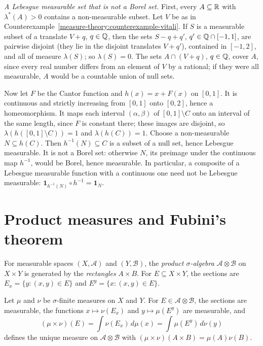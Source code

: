 \begin{counterexample}\label{measure-theory:counterexample-non-borel}
\emph{A Lebesgue measurable set that is not a Borel set.} First, every $A \subseteq \mathbb{R}$ with $\lambda^*(A) > 0$ contains a non-measurable subset. Let $V$ be as in
Counterexample~\ref{measure-theory:counterexample-vitali}. If $S$ is a measurable subset of a translate $V + q$, $q \in \mathbb{Q}$, then the sets $S - q + q'$,
$q' \in \mathbb{Q} \cap [-1, 1]$, are pairwise disjoint (they lie in the disjoint translates $V + q'$), contained in $[-1, 2]$, and all of measure $\lambda(S)$; so
$\lambda(S) = 0$. The sets $A \cap (V + q)$, $q \in \mathbb{Q}$, cover $A$, since every real number differs from an element of $V$ by a rational; if they were all
measurable, $A$ would be a countable union of null sets.

Now let $F$ be the Cantor function and $h(x) = x + F(x)$ on $[0, 1]$. It is continuous and strictly increasing from $[0, 1]$ onto $[0, 2]$, hence a
homeomorphism. It maps each interval $(\alpha, \beta)$ of $[0, 1] \setminus C$ onto an interval of the same length, since $F$ is constant there; these images are
disjoint, so $\lambda(h([0, 1] \setminus C)) = 1$ and $\lambda(h(C)) = 1$. Choose a non-measurable $N \subseteq h(C)$. Then $h^{-1}(N) \subseteq C$ is a subset of a
null set, hence Lebesgue measurable. It is not a Borel set: otherwise $N$, its preimage under the continuous map $h^{-1}$, would be Borel, hence measurable.
In particular, a composite of a Lebesgue measurable function with a continuous one need not be Lebesgue measurable: $\mathbf{1}_{h^{-1}(N)} \circ h^{-1} = \mathbf{1}_N$.
\end{counterexample}

\section{Product measures and Fubini's theorem}\label{measure-theory:section-fubini}

\begin{definition}\label{measure-theory:definition-product-measure}
For measurable spaces $(X, \mathcal{A})$ and $(Y, \mathcal{B})$, the \emph{product $\sigma$-algebra} $\mathcal{A} \otimes \mathcal{B}$ on $X \times Y$ is generated by the \emph{rectangles} $A \times B$. For
$E \subseteq X \times Y$, the sections are $E_x = \{y : (x, y) \in E\}$ and $E^y = \{x : (x, y) \in E\}$.
\end{definition}

\begin{theorem}\label{measure-theory:theorem-product-measure}
Let $\mu$ and $\nu$ be $\sigma$-finite measures on $X$ and $Y$. For $E \in \mathcal{A} \otimes \mathcal{B}$, the sections are measurable, the functions $x \mapsto \nu(E_x)$ and $y \mapsto \mu(E^y)$ are measurable, and
\[
(\mu \times \nu)(E) = \int\nu(E_x)\,d\mu(x) = \int\mu(E^y)\,d\nu(y)
\]
defines the unique measure on $\mathcal{A} \otimes \mathcal{B}$ with $(\mu \times \nu)(A \times B) = \mu(A)\nu(B)$.
\end{theorem}

